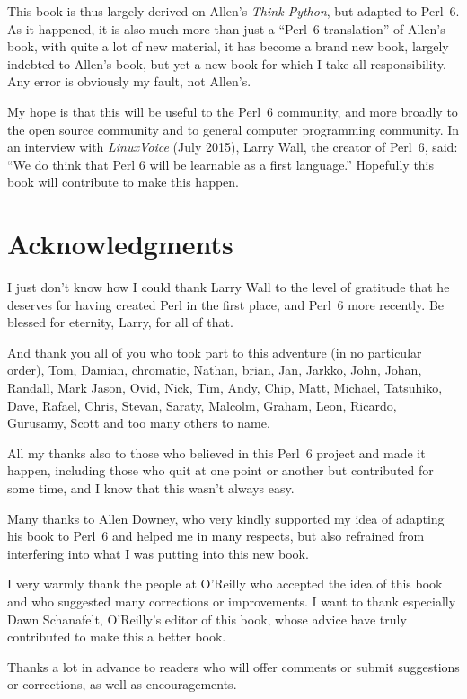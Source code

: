 This book is thus largely derived on Allen's \emph{Think Python}, 
but adapted to Perl~6. As it happened, it is also much more 
than just a ``Perl~6 translation'' of Allen's book, with 
quite a lot of new material, it has become a brand new book, 
largely indebted to Allen's book, but yet a new book for which 
I take all responsibility. Any error is obviously my fault, 
not Allen's.

My hope is that this will be useful to the Perl~6 community, and 
more broadly to the open source community and to general 
computer programming community. In an interview with 
\emph{LinuxVoice} (July 2015), Larry Wall, the creator of Perl~6, 
said: ``We do think that Perl 6 will be learnable as a first language.''
Hopefully this book will contribute to make this happen. 

\section*{Acknowledgments}

I just don't know how I could thank Larry Wall to the level of 
gratitude that he deserves for having created Perl in the first 
place, and Perl~6 more recently. Be blessed for eternity, Larry, 
for all of that. 

And thank you all of you who took part to this 
adventure (in no particular order), Tom, Damian, 
chromatic, Nathan, brian, Jan, Jarkko, John, Johan, Randall, 
Mark Jason, Ovid, Nick, Tim, Andy, Chip, Matt, Michael, Tatsuhiko, 
Dave, Rafael, Chris, Stevan, Saraty, Malcolm, Graham, Leon, 
Ricardo, Gurusamy, Scott and too many others to name.  

All my thanks also to those who believed in 
this Perl~6 project and made it happen, including those who 
quit at one point or another but contributed for some 
time, and I know that this wasn't always easy.

Many thanks to Allen Downey, who very kindly supported my idea of 
adapting his book to Perl~6 and helped me in many respects, but 
also refrained from interfering into what I was putting into 
this new book.

I very warmly thank the people at O'Reilly who accepted the 
idea of this book and who suggested many corrections or 
improvements. I want to thank especially 
Dawn Schanafelt, O'Reilly's editor of this book, whose advice 
have truly contributed to make this a better book.

Thanks a lot in advance to readers who will offer comments 
or submit suggestions or corrections, as well as encouragements.

